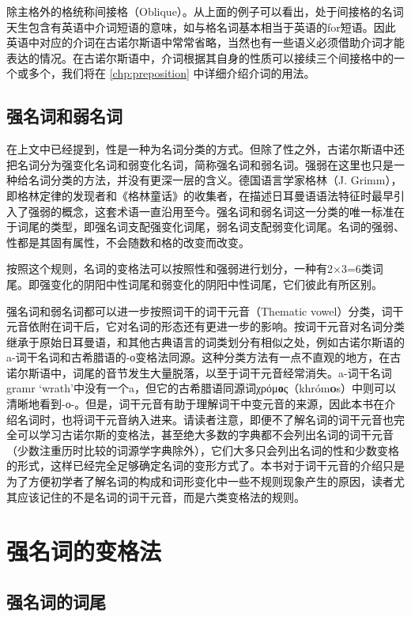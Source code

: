 除主格外的格统称间接格（Oblique）。从上面的例子可以看出，处于间接格的名词天生包含有英语中介词短语的意味，如与格名词基本相当于英语的for短语。因此英语中对应的介词在古诺尔斯语中常常省略，当然也有一些语义必须借助介词才能表达的情况。在古诺尔斯语中，介词根据其自身的性质可以接续三个间接格中的一个或多个，我们将在 \ref{chp:preposition} 中详细介绍介词的用法。

\subsection{强名词和弱名词}
在上文中已经提到，性是一种为名词分类的方式。但除了性之外，古诺尔斯语中还把名词分为强变化名词和弱变化名词，简称强名词和弱名词。强弱在这里也只是一种给名词分类的方法，并没有更深一层的含义。德国语言学家格林（J. Grimm），即格林定律的发现者和《格林童话》的收集者，在描述日耳曼语语法特征时最早引入了强弱的概念，这套术语一直沿用至今。强名词和弱名词这一分类的唯一标准在于词尾的类型，即强名词支配强变化词尾，弱名词支配弱变化词尾。名词的强弱、性都是其固有属性，不会随数和格的改变而改变。

按照这个规则，名词的变格法可以按照性和强弱进行划分，一种有2×3=6类词尾。即强变化的阴阳中性词尾和弱变化的阴阳中性词尾，它们彼此有所区别。

强名词和弱名词都可以进一步按照词干的词干元音（Thematic
vowel）分类，词干元音依附在词干后，它对名词的形态还有更进一步的影响。按词干元音对名词分类继承于原始日耳曼语，和其他古典语言的词类划分有相似之处，例如古诺尔斯语的a-词干名词和古希腊语的-ο变格法同源。这种分类方法有一点不直观的地方，在古诺尔斯语中，词尾的音节发生大量脱落，以至于词干元音经常消失。a-词干名词gramr
`wrath'中没有一个a，但它的古希腊语同源词χρόμ\textbf{ο}ς（khróm\textbf{o}s）中则可以清晰地看到-ο-。但是，词干元音有助于理解词干中变元音的来源，因此本书在介绍名词时，也将词干元音纳入进来。请读者注意，即便不了解名词的词干元音也完全可以学习古诺尔斯的变格法，甚至绝大多数的字典都不会列出名词的词干元音（少数注重历时比较的词源学字典除外），它们大多只会列出名词的性和少数变格的形式，这样已经完全足够确定名词的变形方式了。本书对于词干元音的介绍只是为了方便初学者了解名词的构成和词形变化中一些不规则现象产生的原因，读者尤其应该记住的不是名词的词干元音，而是六类变格法的规则。

\section{强名词的变格法}
\label{强名词的变格法}

\subsection{强名词的词尾}
\label{强名词的词尾}

